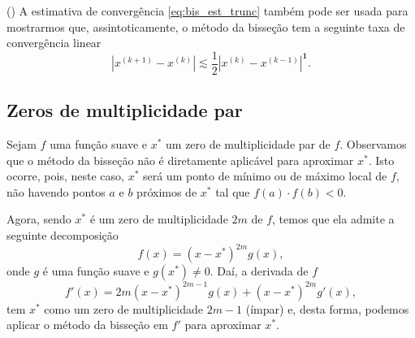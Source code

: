 \begin{obs}()
  A estimativa de convergência \eqref{eq:bis_est_trunc} também pode ser usada para mostrarmos que, assintoticamente, o método da bisseção tem a seguinte taxa de convergência linear
  \begin{equation}
    \left|x^{(k+1)} - x^{(k)}\right| \lesssim \frac{1}{2}\left|x^{(k)} - x^{(k-1)}\right|^{\pmb{1}}.
  \end{equation}
\end{obs}

\subsection{Zeros de multiplicidade par}

Sejam $f$ uma função suave e $x^*$ um zero de multiplicidade par de $f$. Observamos que o método da bisseção não é diretamente aplicável para aproximar $x^*$. Isto ocorre, pois, neste caso, $x^*$ será um ponto de mínimo ou de máximo local de $f$, não havendo pontos $a$ e $b$ próximos de $x^*$ tal que $f(a)\cdot f(b) < 0$.

Agora, sendo $x^*$ é um zero de multiplicidade $2m$ de $f$, temos que ela admite a seguinte decomposição
\begin{equation}
  f(x) = (x-x^*)^{2m}g(x),
\end{equation}
onde $g$ é uma função suave e $g(x^*)\neq 0$. Daí, a derivada de $f$
\begin{equation}
  f'(x) = 2m(x-x^*)^{2m-1}g(x) + (x-x^*)^{2m}g'(x),
\end{equation}
tem $x^*$ como um zero de multiplicidade $2m-1$ (ímpar) e, desta forma, podemos aplicar o método da bisseção em $f'$ para aproximar $x^*$.

